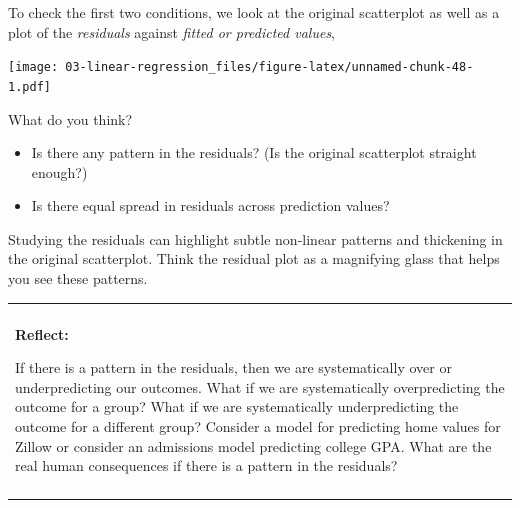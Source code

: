 \documentclass[
]{book}
\newenvironment{Shaded}{\begin{snugshade}}{\end{snugshade}}
\newcommand{\DataTypeTok}[1]{\textcolor[rgb]{0.13,0.29,0.53}{#1}}
\newcommand{\DecValTok}[1]{\textcolor[rgb]{0.00,0.00,0.81}{#1}}
\newcommand{\KeywordTok}[1]{\textcolor[rgb]{0.13,0.29,0.53}{\textbf{#1}}}
\newcommand{\NormalTok}[1]{#1}
\newcommand{\OperatorTok}[1]{\textcolor[rgb]{0.81,0.36,0.00}{\textbf{#1}}}
\newcommand{\OtherTok}[1]{\textcolor[rgb]{0.56,0.35,0.01}{#1}}
\newcommand{\StringTok}[1]{\textcolor[rgb]{0.31,0.60,0.02}{#1}}
\providecommand{\tightlist}{%
  \setlength{\itemsep}{0pt}\setlength{\parskip}{0pt}}
\newenvironment{reflect}
{
    \begin{center}
    
    \begin{tabular}{|p{0.8\textwidth}|}
    \rowcolor{LightBlue}
    \hline\\
    \rowcolor{LightBlue}
    \textbf{Reflect:}
}
{
    \\\rowcolor{LightBlue}
    \\\hline
    \end{tabular} 
    \end{center}
}
\begin{document}
To check the first two conditions, we look at the original scatterplot as well as a plot of the \emph{residuals} against \emph{fitted or predicted values},

\begin{Shaded}
\end{Shaded}

\texttt{[image: 03-linear-regression\_files/figure-latex/unnamed-chunk-48-1.pdf]}

What do you think?

\begin{itemize}
\tightlist
\item
  Is there any pattern in the residuals? (Is the original scatterplot straight enough?)
\item
  Is there equal spread in residuals across prediction values?
\end{itemize}

Studying the residuals can highlight subtle non-linear patterns and thickening in the original scatterplot. Think the residual plot as a magnifying glass that helps you see these patterns.

\begin{reflect}
If there is a pattern in the residuals, then we are systematically over
or underpredicting our outcomes. What if we are systematically
overpredicting the outcome for a group? What if we are systematically
underpredicting the outcome for a different group? Consider a model for
predicting home values for Zillow or consider an admissions model
predicting college GPA. What are the real human consequences if there is
a pattern in the residuals?
\end{reflect}
\end{document}
